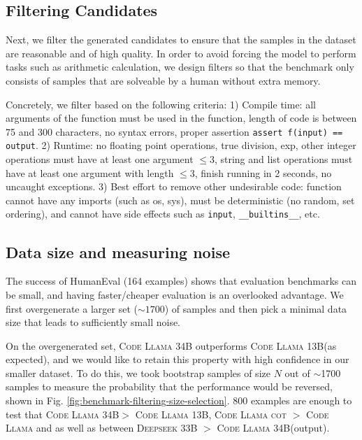 \documentclass[twoside,11pt,preprint]{article}
\newcommand{\codellamamed}{\textsc{Code Llama 13B}\xspace}
\newcommand{\codellamalarge}{\textsc{Code Llama 34B}\xspace}
\begin{document}
\subsection{Filtering Candidates} \label{subsec:filtering-candidates}
Next, we filter the generated candidates to ensure that the samples in the dataset are reasonable and of high quality. In order to avoid forcing the model to perform tasks such as arithmetic calculation, we design filters so that the benchmark only consists of samples that are solveable by a human without extra memory.

Concretely, we filter based on the following criteria: 1) Compile time: all arguments of the function must be used in the function, length of code is between 75 and 300 characters, no syntax errors, proper assertion \texttt{assert f(input) == output}. 2) Runtime: no floating point operations, true division, exp, other integer operations must have at least one argument $\leq 3$, string and list operations must have at least one argument with length $\leq 3$, finish running in 2 seconds, no uncaught exceptions. 3) Best effort to remove other undesirable code: function cannot have any imports (such as os, sys), must be deterministic (no random, set ordering), and cannot have side effects such as \texttt{input}, \texttt{\_\_builtins\_\_}, etc.

\subsection{Data size and measuring noise} \label{subsec:data-size-noise}
The success of HumanEval (164 examples) shows that evaluation benchmarks can be small, and having faster/cheaper evaluation is an overlooked advantage. We first overgenerate a larger set ($\sim1700$) of samples and then pick a minimal data size that leads to sufficiently small noise. 


On the overgenerated set, \codellamalarge outperforms \codellamamed (as expected), and we would like to retain this property with high confidence in our smaller dataset. To do this, we took bootstrap samples of size $N$ out of $\sim$1700 samples to measure the probability that the performance would be reversed, shown in Fig. \ref{fig:benchmark-filtering-size-selection}. 800 examples are enough to test that \codellamalarge $>$ \codellamamed, \textsc{Code Llama cot} $>$ \textsc{Code Llama} and  as well as between \textsc{Deepseek 33B} $>$ \codellamalarge (output).
\end{document}
